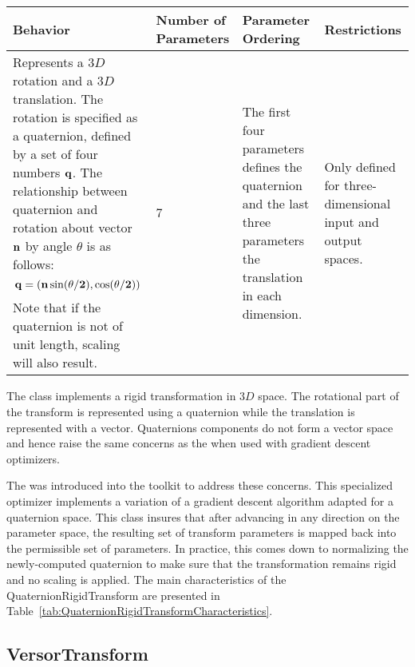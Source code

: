 \begin{table}
\begin{center}
\begin{tabular}{| p{4cm} | p{1.8cm} | p{2.5cm} | p{3cm} |}
\hline
\textbf{Behavior} &
\textbf{Number of Parameters} &
\textbf{Parameter Ordering} &
\textbf{Restrictions} \\
\hline\hline
Represents a $3D$ rotation and a $3D$ translation. The rotation is specified as a
quaternion, defined by a set of four numbers $\bf{q}$.  The relationship
between quaternion and rotation about vector $\bf{n}$ by angle $\theta$ is as
follows: \[ \bf{q} = (\bf{n}\sin(\theta/2), \cos(\theta/2))\] Note that if the
quaternion is not of unit length, scaling will also result. &
7 &
The first four parameters defines the quaternion and the last three parameters
the translation in each dimension. &
Only defined for three-dimensional input and output spaces. \\
\hline
\end{tabular}
\end{center}
\end{table}

The  class implements a rigid
transformation in $3D$ space. The rotational part of the transform is
represented using a quaternion while the translation is represented with a
vector. Quaternions components do not form a vector space and hence raise the
same concerns as the  when used with gradient
descent optimizers.

The  was introduced into the toolkit to address these concerns.  This specialized optimizer implements a variation of a
gradient descent algorithm adapted for a quaternion space.  This class
insures that after advancing in any direction on the parameter space, the
resulting set of transform parameters is mapped back into the permissible
set of parameters. In practice, this comes down to normalizing the newly-computed quaternion to make sure that the transformation remains rigid and no
scaling is applied.  The main characteristics of the
QuaternionRigidTransform are presented in
Table~\ref{tab:QuaternionRigidTransformCharacteristics}.



\subsection{VersorTransform}
\label{sec:VersorTransform}

